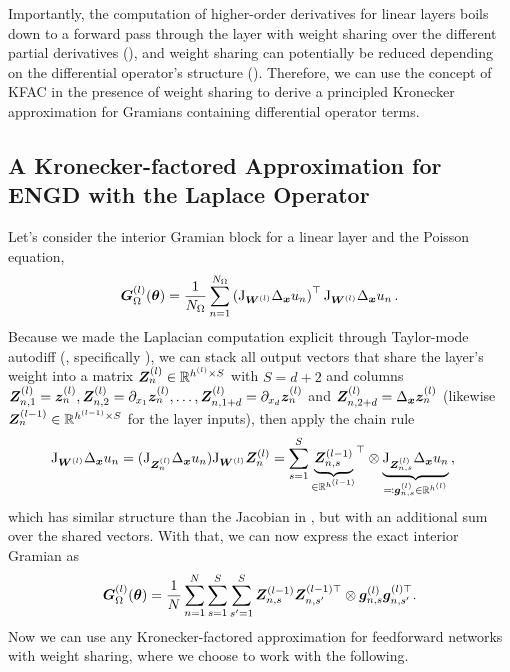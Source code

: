 Importantly, the computation of higher-order derivatives for linear layers boils down to a forward pass through the layer with weight sharing over the different partial derivatives (), and weight sharing can potentially be reduced depending on the differential operator's structure ().
Therefore, we can use the concept of KFAC in the presence of weight sharing to derive a principled Kronecker approximation for Gramians containing differential operator terms.

\subsection{A Kronecker-factored Approximation for ENGD with the Laplace Operator}\label{sec:KFAC-Laplace}
Let's consider the interior Gramian block for a linear layer and the Poisson equation,
\begin{align}
  {\bm{G}}^{(l)}_\Omega({\bm{\theta}})
  =
  \frac{1}{N_\Omega} \sum_{n=1}^{N_\Omega}
  \left(
  \mathrm{J}_{{\bm{W}}^{(l)}} \Delta_{\bm{x}} u_n  \right)^\top
  \mathrm{J}_{{\bm{W}}^{(l)}} \Delta_{\bm{x}} u_n\,.
\end{align}
Because we made the Laplacian computation explicit through Taylor-mode autodiff (, specifically ), we can stack all output vectors that share the layer's weight into a matrix
${\bm{Z}}_n^{(l)} \in {\mathbb{R}}^{h^{(l)} \times S}$ with $S = d+2$ and columns ${\bm{Z}}_{n, 1}^{(l)} = {\bm{z}}_n^{(l)}, {\bm{Z}}_{n, 2}^{(l)} = \partial_{x_1}{\bm{z}}_n^{(l)}, \dots, {\bm{Z}}_{n, 1+d}^{(l)} = \partial_{x_d}{\bm{z}}_n^{(l)}$ and ${\bm{Z}}_{n, 2+d}^{(l)} = \Delta_{\bm{x}}{\bm{z}}_n^{(l)}$ (likewise ${\bm{Z}}_n^{(l-1)} \in {\mathbb{R}}^{h^{(l-1)} \times S}$ for the layer inputs), then apply the chain rule
\begin{align*}
  \mathrm{J}_{{\bm{W}}^{(l)}} \Delta_{\bm{x}} u_n
  &=
    (\mathrm{J}_{{\bm{Z}}_n^{(l)}}\Delta_{\bm{x}} u_n) \mathrm{J}_{{\bm{W}}^{(l)}} {\bm{Z}}_n^{(l)}
    =
    \sum_{s=1}^S
    {
    \underbrace{{\bm{Z}}^{(l-1)}_{n,s}}_{\in {\mathbb{R}}^{h^{(l-1)}}}
    }^{\top}
    \otimes
    \underbrace{\mathrm{J}_{{\bm{Z}}^{(l)}_{n,s}} \Delta_{{\bm{x}}}u_n}_{\eqqcolon {\bm{g}}_{n,s}^{(l)} \in {\mathbb{R}}^{h^{(l)}}}\,,
\end{align*}
which has similar structure than the Jacobian in , but with an additional sum over the shared vectors. With that, we can now express the exact interior Gramian as
\begin{equation}\label{eq:laplace_gramian_block_exact}
    {\bm{G}}^{(l)}_\Omega({\bm{\theta}})
    =
    \frac{1}{N}
    \sum_{n=1}^N
    \sum_{s=1}^S
    \sum_{s'=1}^S
    {\bm{Z}}^{(l-1)}_{n,s} {\bm{Z}}^{(l-1)\top}_{n,s'} \otimes {\bm{g}}_{n,s}^{(l)} {\bm{g}}_{n,s'}^{(l)\top}.
\end{equation}
Now we can use any Kronecker-factored approximation for feedforward networks with weight sharing, where we choose to work with the following.

